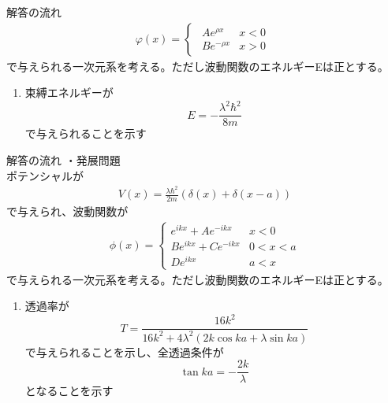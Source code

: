 \documentclass{jsarticle}  %
\numberwithin{equation}{section} %
\numberwithin{figure}{section}
\begin{document}
\begin{itembox}[l]{\large{解答の流れ}}
\begin{align}
            \varphi (x) = \left\{
            \begin{aligned}
                \begin{matrix}
                    Ae^{\rho x}&x<0\\
                    Be^{-\rho x}&x>0
                \end{matrix}
            \end{aligned}
            \right.
        \end{align}
        で与えられる一次元系を考える。ただし波動関数のエネルギーEは正とする。
        \begin{enumerate}
            \item 束縛エネルギーが
            \[ E = -\frac{\lambda^2 \hbar^2}{8m} \]
            で与えられることを示す
        \end{enumerate}
    \end{itembox}
    \begin{itembox}[l]{\large{解答の流れ}}
        ・発展問題 \\
        ポテンシャルが
        \begin{align}
            V(x) = \frac{\lambda \hbar^2}{2m}(\delta(x) + \delta(x-a))
        \end{align}
        で与えられ、波動関数が
        \begin{align}
            \phi (x) = 
            \left\{
            \begin{matrix}
                e^{ikx}+Ae^{-ikx}&x<0\\
                    Be^{ikx}+Ce^{-ikx}&0<x<a\\
                    De^{ikx}&a<x
            \end{matrix}
            \right.
        \end{align}
        で与えられる一次元系を考える。ただし波動関数のエネルギーEは正とする。
        \begin{enumerate}
            \item 透過率が
            \[ T = \frac{16k^2}{16k^2 + 4\lambda^2 (2k \cos ka + \lambda \sin ka)} \]
            で与えられることを示し、全透過条件が
            \[ \tan ka = -\frac{2k}{\lambda} \]
            となることを示す
        \end{enumerate}
    \end{itembox}
\end{document}
